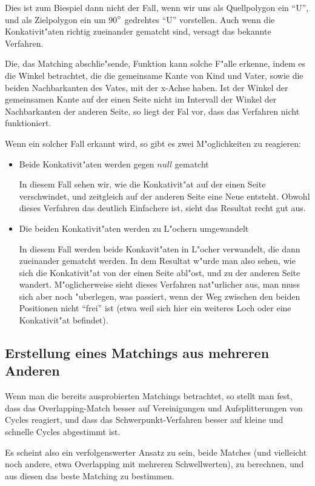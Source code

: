 Dies ist zum Biespiel dann nicht der Fall, wenn wir uns als Quellpolygon ein "`U"', und als Zielpolygon ein um 90$\degree$ gedrehtes "`U"' vorstellen. Auch wenn die Konkativit"aten richtig zueinander gematcht sind, versagt das bekannte Verfahren.

Die, das Matching abschlie"sende, Funktion kann solche F"alle erkenne, indem es die Winkel betrachtet, die die gemeinsame Kante von Kind und Vater, sowie die beiden Nachbarkanten des Vates, mit der x-Achse haben. Ist der Winkel der gemeinsamen Kante auf der einen Seite nicht im  Intervall der Winkel der Nachbarkanten der anderen Seite, so liegt der Fal vor, dass das Verfahren nicht funktioniert.

Wenn ein solcher Fall erkannt wird, so gibt es zwei M"oglichkeiten zu reagieren:
\begin{itemize}
\item Beide Konkativit"aten werden gegen $null$ gematcht

In diesem Fall sehen wir, wie die Konkativit"at auf der einen Seite verschwindet, und zeitgleich auf der anderen Seite eine Neue entsteht. Obwohl dieses Verfahren das deutlich Einfachere ist, sieht das Resultat recht gut aus.

\item Die beiden Konkativit"aten werden zu L"ochern umgewandelt

In diesem Fall werden beide Konkavit"aten in L"ocher verwandelt, die dann zueinander gematcht werden. In dem Resultat w"urde man also sehen, wie sich die Konkativit"at von der einen Seite abl"ost, und zu der anderen Seite wandert. M"oglicherweise sieht dieses Verfahren nat"urlicher aus, man muss sich aber noch "uberlegen, was passiert, wenn der Weg zwischen den beiden Positionen nicht "`frei"' ist (etwa weil sich hier ein weiteres Loch oder eine Konkativit"at befindet).

\end{itemize}


\subsection{Erstellung eines Matchings aus mehreren Anderen}

Wenn man die bereits ausprobierten Matchings betrachtet, so stellt man fest, dass das Overlapping-Match besser auf Vereinigungen und Aufsplitterungen von Cycles reagiert, und dass das Schwerpunkt-Verfahren besser auf kleine und schnelle Cycles abgestimmt ist. 

Es scheint also ein verfolgenswerter Ansatz zu sein, beide Matches (und vielleicht noch andere, etwa Overlapping mit mehreren Schwellwerten), zu berechnen, und aus diesen das beste Matching zu bestimmen. 

